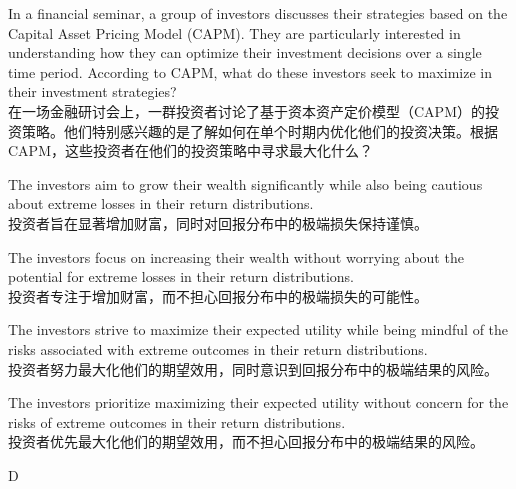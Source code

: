 \documentclass{article}
\newcounter{question} %
\begin{document}
\begin{question}
    In a financial seminar, a group of investors discusses their strategies based on the Capital Asset Pricing Model (CAPM). They are particularly interested in understanding how they can optimize their investment decisions over a single time period. According to CAPM, what do these investors seek to maximize in their investment strategies?
    \\
    在一场金融研讨会上，一群投资者讨论了基于资本资产定价模型（CAPM）的投资策略。他们特别感兴趣的是了解如何在单个时期内优化他们的投资决策。根据CAPM，这些投资者在他们的投资策略中寻求最大化什么？
\end{question}

\begin{choices}
    \item The investors aim to grow their wealth significantly while also being cautious about extreme losses in their return distributions.
    \\
    投资者旨在显著增加财富，同时对回报分布中的极端损失保持谨慎。
    \item The investors focus on increasing their wealth without worrying about the potential for extreme losses in their return distributions.
    \\
    投资者专注于增加财富，而不担心回报分布中的极端损失的可能性。
    \item The investors strive to maximize their expected utility while being mindful of the risks associated with extreme outcomes in their return distributions.
    \\
    投资者努力最大化他们的期望效用，同时意识到回报分布中的极端结果的风险。
    \item The investors prioritize maximizing their expected utility without concern for the risks of extreme outcomes in their return distributions.
    \\
    投资者优先最大化他们的期望效用，而不担心回报分布中的极端结果的风险。
\end{choices}

\begin{correctanswer}
    D
\end{correctanswer}
\end{document}
